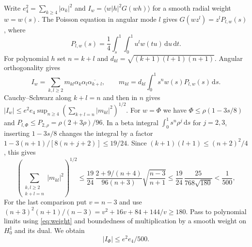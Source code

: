 \documentclass[11pt,a4paper,reqno]{amsart}
\theoremstyle{remark}
\numberwithin{equation}{section}
\newcommand{\dd}{\,\mathrm d}
\newcommand{\davg}[1]{\langle #1\rangle}
\begin{document}
Write $e_4^2=\sum_{k\ge4}|\alpha_k|^2$ and
$I_w=\davg{w|h|^2G(wh)}$ for a smooth radial weight $w=w(s)$. The Poisson
equation in angular mode $l$ gives $G(wz^l)=z^lP_{l,w}(s)$, where
\begin{equation}\label{eq:free-profile}
  P_{l,w}(s)=\frac14\int_s^1\int_0^1 u^l w(tu)\dd u\dd t.
\end{equation}
For polynomial $h$ set $n=k+l$ and $d_{kl}=\sqrt{(k+1)(l+1)(n+1)}$.
Angular orthogonality gives
\[
  I_w=\sum_{k,l\ge2}m_{kl}\alpha_k\alpha_l\overline{\alpha_{k+l}},
  \qquad
  m_{kl}=d_{kl}\int_0^1 s^n w(s)P_{l,w}(s)\dd s.
\]
Cauchy--Schwarz along $k+l=n$ and then in $n$ gives
$|I_w|\le e^2e_4\sup_{n\ge4}(\sum_{k+l=n}|m_{kl}|^2)^{1/2}$.
For $w=\Phi$ we have $\Phi\le\rho(1-3s/8)$ and
$P_{l,\Phi}\le P_{2,\rho}=\rho(2+3\rho)/96$. In a beta integral
$\int_0^1s^n\rho^j\dd s$ for $j=2,3$, inserting $1-3s/8$ changes the
integral by a factor $1-3(n+1)/[8(n+j+2)]\le19/24$. Since
$(k+1)(l+1)\le(n+2)^2/4$, this gives
\[
  \left(\sum_{\substack{k,l\ge2\\ k+l=n}}|m_{kl}|^2\right)^{1/2}
    \le\frac{19}{24}\,\frac{2+9/(n+4)}{96(n+3)}\sqrt{\frac{n-3}{n+1}}
    \le\frac{19}{24}\,\frac{25}{768\sqrt{180}}<\frac{1}{500},
\]
For the last comparison put $v=n-3$ and use
$(n+3)^2(n+1)/(n-3)=v^2+16v+84+144/v\ge180$.
Pass to polynomial limits using \eqref{eq:weight} and boundedness of
multiplication by a smooth weight on $H_0^1$ and its dual. We obtain
\begin{equation}\label{eq:mixedI}
                         |I_\Phi|\le e^2e_4/500 .
\end{equation}
\end{document}
